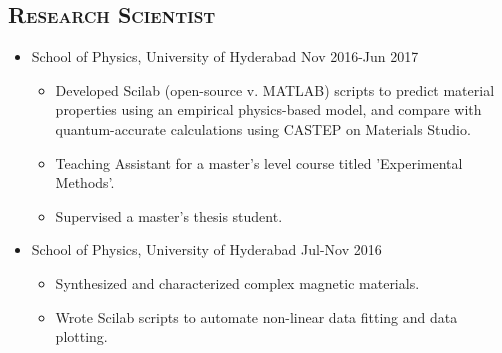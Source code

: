 \subsection*{\textsc{Research Scientist}}
\begin{itemize}[noitemsep]
\item School of Physics, University of Hyderabad \hfill {Nov 2016-Jun 2017}
\begin{itemize}[noitemsep,topsep=0pt]
\item Developed Scilab (open-source v. MATLAB) scripts to predict material properties using an empirical physics-based model, and compare with quantum-accurate calculations using CASTEP on Materials Studio.
\item Teaching Assistant for a master's level course titled 'Experimental Methods'.
\item Supervised a master's thesis student.
\end{itemize}\item School of Physics, University of Hyderabad \hfill {Jul-Nov 2016}
\begin{itemize}[noitemsep,topsep=0pt]
\item Synthesized and characterized complex magnetic materials.
\item Wrote Scilab scripts to automate non-linear data fitting and data plotting.
\end{itemize}
\end{itemize}

